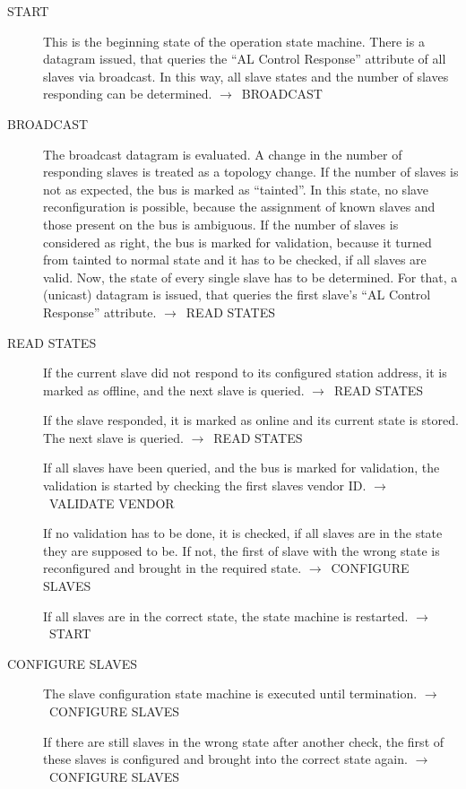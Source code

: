 \documentclass[a4paper,12pt,BCOR6mm,bibtotoc,idxtotoc]{scrbook}
\begin{document}
\begin{description}
\item[START] This is the beginning state of the operation state
  machine. There is a datagram issued, that queries the ``AL Control
  Response'' attribute \cite[section~5.3.2]{alspec} of all slaves via
  broadcast. In this way, all slave states and the number of slaves
  responding can be determined.  $\rightarrow$~BROADCAST

\item[BROADCAST] The broadcast datagram is evaluated. A change in the number of
responding slaves is treated as a topology change. If the number of slaves is
not as expected, the bus is marked as ``tainted''. In this state, no slave
reconfiguration is possible, because the assignment of known slaves and those
present on the bus is ambiguous. If the number of slaves is considered as
right, the bus is marked for validation, because it turned from tainted to
normal state and it has to be checked, if all slaves are valid. Now, the state
of every single slave has to be determined. For that, a (unicast) datagram is
issued, that queries the first slave's ``AL Control Response'' attribute.
$\rightarrow$~READ STATES

\item[READ STATES] If the current slave did not respond to its configured
station address, it is marked as offline, and the next slave is queried.
$\rightarrow$~READ STATES

  If the slave responded, it is marked as online and its current state
  is stored. The next slave is queried. $\rightarrow$~READ STATES

  If all slaves have been queried, and the bus is marked for
  validation, the validation is started by checking the first slaves
  vendor ID. $\rightarrow$~VALIDATE VENDOR

  If no validation has to be done, it is checked, if all slaves are in
  the state they are supposed to be. If not, the first of slave with
  the wrong state is reconfigured and brought in the required state.
  $\rightarrow$~CONFIGURE SLAVES

  If all slaves are in the correct state, the state machine is
  restarted. $\rightarrow$~START

\item[CONFIGURE SLAVES] The slave configuration state machine is
  executed until termination. $\rightarrow$~CONFIGURE SLAVES

  If there are still slaves in the wrong state after another check,
  the first of these slaves is configured and brought into the correct
  state again. $\rightarrow$~CONFIGURE SLAVES


\end{description}
\end{document}
